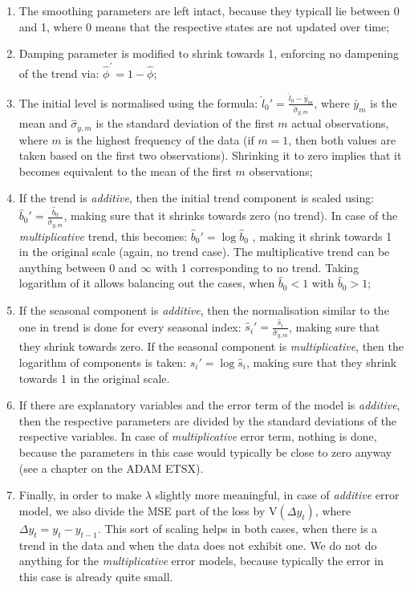 \documentclass[
]{book}
\providecommand{\tightlist}{%
  \setlength{\itemsep}{0pt}\setlength{\parskip}{0pt}}
\theoremstyle{definition}
\theoremstyle{definition}
\theoremstyle{definition}
\theoremstyle{definition}
\theoremstyle{remark}
\begin{document}
\begin{enumerate}
\def\labelenumi{\arabic{enumi}.}
\tightlist
\item
  The smoothing parameters are left intact, because they typicall lie between 0 and 1, where 0 means that the respective states are not updated over time;
\item
  Damping parameter is modified to shrink towards 1, enforcing no dampening of the trend via: \(\hat{\phi}^\prime=1-\hat{\phi}\);
\item
  The initial level is normalised using the formula: \(\hat{l}_0' = \frac{\hat{l}_0 - \bar{y}_m}{\hat{\sigma}_{y,m}}\), where \(\bar{y}_m\) is the mean and \(\hat{\sigma}_{y,m}\) is the standard deviation of the first \(m\) actual observations, where \(m\) is the highest frequency of the data (if \(m=1\), then both values are taken based on the first two observations). Shrinking it to zero implies that it becomes equivalent to the mean of the first \(m\) observations;
\item
  If the trend is \emph{additive}, then the initial trend component is scaled using: \(\hat{b}_0' = \frac{\hat{b}_0}{\hat{\sigma}_{y,m}}\), making sure that it shrinks towards zero (no trend). In case of the \emph{multiplicative} trend, this becomes: \(\hat{b}_0' = \log{\hat{b}_0}\) , making it shrink towards 1 in the original scale (again, no trend case). The multiplicative trend can be anything between 0 and \(\infty\) with 1 corresponding to no trend. Taking logarithm of it allows balancing out the cases, when \(\hat{b}_0<1\) with \(\hat{b}_0>1\);
\item
  If the seasonal component is \emph{additive}, then the normalisation similar to the one in trend is done for every seasonal index: \(\hat{s}_i' = \frac{\hat{s}_i}{\hat{\sigma}_{y,m}}\), making sure that they shrink towards zero. If the seasonal component is \emph{multiplicative}, then the logarithm of components is taken: \(\hat{s}_i' = \log{\hat{s}_i}\), making sure that they shrink towards 1 in the original scale.
\item
  If there are explanatory variables and the error term of the model is \emph{additive}, then the respective parameters are divided by the standard deviations of the respective variables. In case of \emph{multiplicative} error term, nothing is done, because the parameters in this case would typically be close to zero anyway (see a chapter on the ADAM ETSX).
\item
  Finally, in order to make \(\lambda\) slightly more meaningful, in case of \emph{additive} error model, we also divide the MSE part of the loss by \(\mathrm{V}\left({\Delta}y_t\right)\), where \({\Delta}y_t=y_t-y_{t-1}\). This sort of scaling helps in both cases, when there is a trend in the data and when the data does not exhibit one. We do not do anything for the \emph{multiplicative} error models, because typically the error in this case is already quite small.
\end{enumerate}
\end{document}
